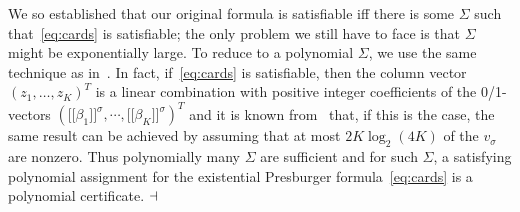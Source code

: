 \documentclass[11pt,a4paper]{article}
\begin{document}
We so established that our original formula is satisfiable iff there is some $\Sigma$ such that~\eqref{eq:cards} is satisfiable;
the only problem we still have to face is that $\Sigma$ might be exponentially 
large. To reduce to a polynomial $\Sigma$, we use the same technique as in~\cite{cade21}. In fact, if~\eqref{eq:cards} is satisfiable, then the column vector $(z_1, \dots, z_K)^T$ is a linear combination with positive integer coefficients of the 0/1-vectors $(\lbrack\!\lbrack \beta_1\rbrack\!\rbrack^\sigma,
           \cdots,
            \lbrack\!\lbrack \beta_K\rbrack\!\rbrack^\sigma)^T$
and it is known from~\cite{ro} that, if this is the case, the same result can be achieved by assuming that at most $2K \log_2(4K)$ of the $v_{\sigma}$ are nonzero.  Thus polynomially many $\Sigma$ are sufficient and
for such $\Sigma$, a satisfying polynomial assignment for the existential Presburger formula~\eqref{eq:cards} is a polynomial certificate. 
 $\hfill\dashv$
\end{document}
